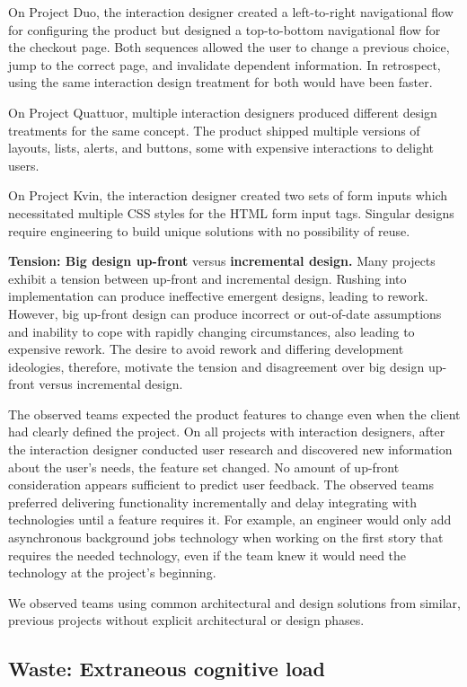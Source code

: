 On Project Duo, the interaction designer created a left-to-right navigational flow for configuring the product but designed a top-to-bottom navigational flow for the checkout page. Both sequences allowed the user to change a previous choice, jump to the correct page, and invalidate dependent information. In retrospect, using the same interaction design treatment for both would have been faster. 

On Project Quattuor, multiple interaction designers produced different design treatments for the same concept. The product shipped multiple versions of layouts, lists, alerts, and buttons, some with expensive interactions to delight users. 

On Project Kvin, the interaction designer created two sets of form inputs which necessitated multiple CSS styles for the HTML form input tags. Singular designs require engineering to build unique solutions with no possibility of reuse.   

\textbf{Tension: Big design up-front} versus \textbf{incremental design.}
Many projects exhibit a tension between up-front and incremental design. Rushing into implementation can produce ineffective emergent designs, leading to rework. However, big up-front design can produce incorrect or out-of-date assumptions and inability to cope with rapidly changing circumstances, also leading to expensive rework. The desire to avoid rework and differing development ideologies, therefore, motivate the tension and disagreement over big design up-front versus incremental design. 

The observed teams expected the product features to change even when the client had clearly defined the project. On all projects with interaction designers, after the interaction designer conducted user research and discovered new information about the user's needs, the feature set changed. No amount of up-front consideration appears sufficient to predict user feedback. The observed teams preferred delivering functionality incrementally and delay integrating with technologies until a feature requires it. For example, an engineer would only add asynchronous background jobs technology when working on the first story that requires the needed technology, even if the team knew it would need the technology at the project's beginning.

We observed teams using common architectural and design solutions from similar, previous projects without explicit architectural or design phases.

\subsection{Waste: Extraneous cognitive load}

